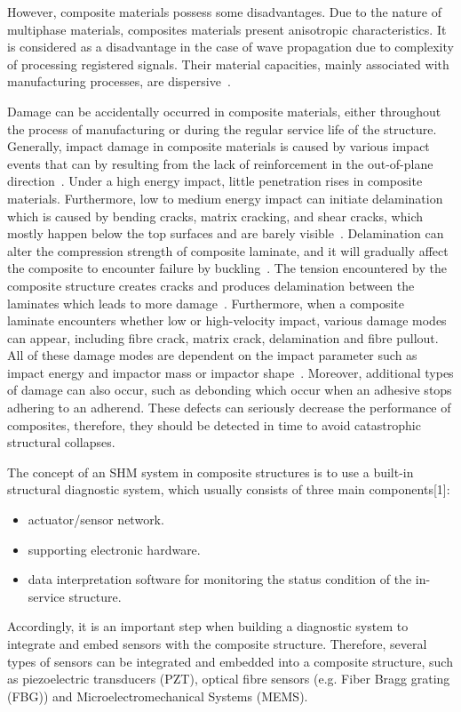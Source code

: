However, composite materials possess some disadvantages.
Due to the nature of multiphase materials, composites materials present 
anisotropic characteristics. 
It is considered as a disadvantage in the case of wave propagation due to complexity of processing registered signals. 
Their material capacities, mainly associated with manufacturing processes, are 
dispersive~\cite{Awad2012}. 

Damage can be accidentally occurred in composite materials, either throughout the process of manufacturing or during the regular service life of the structure. 
Generally, impact damage in composite materials is caused by various impact events that can by resulting from the lack of reinforcement in the out-of-plane direction~\cite{Cai2012}. 
Under a high energy impact, little penetration rises in composite materials.  
Furthermore, low to medium energy impact can initiate delamination which is caused by bending cracks, matrix cracking, and shear cracks,  which mostly happen below the top surfaces and are barely visible~\cite{Cai2012}. 
Delamination can alter the compression strength of composite laminate, and it will gradually affect the composite to encounter failure by buckling~\cite{NurAzrieBtSafri2018}.
The tension encountered by the composite structure creates cracks and produces delamination between the laminates which leads to more damage~\cite{NurAzrieBtSafri2018}. 
Furthermore, when a composite laminate encounters whether low or high-velocity impact, various damage modes can appear, including fibre crack, matrix crack, delamination and fibre pullout. 
All of these damage modes are dependent on the impact parameter such as impact energy and impactor mass or impactor shape~\cite{NurAzrieBtSafri2018}.
Moreover, additional types of damage can also occur, such as debonding which occur when an adhesive stops adhering to an adherend.
These defects can seriously decrease the performance of composites,  therefore, 
they should be detected in time to avoid catastrophic structural collapses.  

The concept of an SHM system in composite structures is to use a built-in structural diagnostic system, which usually consists of three main components[1]: 
\begin{itemize}
	\item actuator/sensor network.
	\item supporting electronic hardware.
	\item data interpretation software for monitoring the status condition of the in-service structure.
\end{itemize}
Accordingly, it is an important step when building a diagnostic system to integrate and embed sensors with the composite structure. 
Therefore, several types of sensors can be integrated and embedded into a composite structure, such as piezoelectric transducers (PZT), optical fibre sensors (e.g. Fiber Bragg grating (FBG)) and Microelectromechanical Systems (MEMS).


